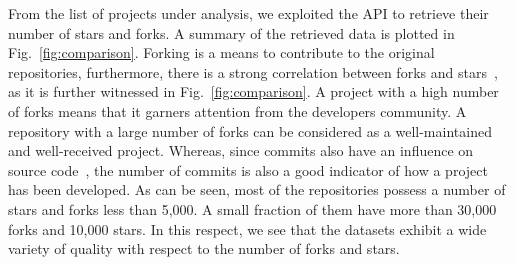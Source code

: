 From the list of projects under analysis, we exploited the \GH API to retrieve 
their number of stars and forks. A summary of the retrieved data is plotted in 
Fig.~\ref{fig:comparison}. %
Forking is a means to contribute to the original repositories, %
furthermore, there is a strong correlation between forks and stars~\cite{7816479}, as it is further witnessed in Fig.~\ref{fig:comparison}. A project with a high number of forks means that it garners attention from the developers community. A repository with a large number of forks can be considered as a well-maintained and well-received project. Whereas, since commits also have an influence on source code~\cite{8009930}, the number of commits is also a good indicator of how a project has been developed. As can be seen, most of the repositories possess a number of stars and forks less than 5,000. A small fraction of them have more than 30,000 forks and 10,000 stars. In this respect, we see that the datasets exhibit a wide variety of quality with respect to the number of forks and stars.










